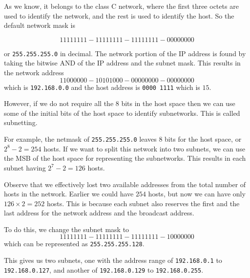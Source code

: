 As we know, it belongs to the class C network,
where the first three octets are used to identify
the network, and the rest is used to identify the
host. So the default network mask is

\[
1111 1111 - 1111 1111 - 1111 1111 - 0000 0000
\]

or \texttt{255.255.255.0} in decimal.
The network portion of the IP address is
found by taking the bitwise AND
of the IP address and the subnet mask.
This results in the network address
\[
1100 0000 - 1010 1000 - 0000 0000 - 0000 0000
\]
which is \texttt{192.168.0.0} and the host address
is \texttt{0000 1111} which is $15$.

However, if we do not require all the 8 bits in the
host space
then we can use some of the initial bits of the
host space to identify subnetworks. This is called
subnetting.

For example, the netmask of \texttt{255.255.255.0}
leaves 8 bits for the host space, or $2^8 - 2 = 254$
hosts. If we want to split this network into
two subnets, we can use the MSB of the host space
for representing the subnetworks. This results in
each subnet having $2^7 - 2 = 126$ hosts.

\begin{remark}
Observe that we effectively lost two available addresses
from the total number of hosts in the network.
Earlier we could have $254$ hosts, but now we can
have only $126 \times 2 = 252$ hosts. This is because
each subnet also reserves the first and the last
address for the network address and the broadcast
address.
\end{remark}

To do this, we change the subnet mask to
\[
1111 1111 - 1111 1111 - 1111 1111 - 1000 0000
\]
which can be represented as \texttt{255.255.255.128}.

This gives us two subnets, one with the address range
of \texttt{192.168.0.1} to \texttt{192.168.0.127}, and
another of \texttt{192.168.0.129} to \texttt{192.168.0.255}.

